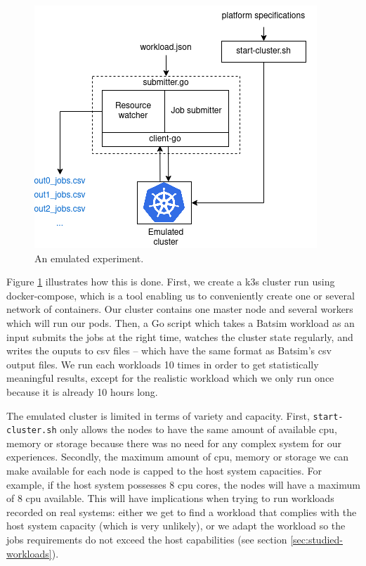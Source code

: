 \begin{figure}[H]
	\centering
	\includegraphics[scale=0.7]{./imgs/prot-k3s.png}
	\caption{An emulated experiment.}
	\label{fig:emulated-expe}
\end{figure}

Figure \ref{fig:emulated-expe} illustrates how this is done. First, we create a
k3s cluster run using docker-compose, which is a tool enabling us to
conveniently create one or several network of containers. Our cluster contains
one master node and several workers which will run our pods. Then, a Go script
which takes a Batsim workload as an input submits the jobs at the right time,
watches the cluster state regularly, and writes the ouputs to csv files --
which have the same format as Batsim's csv output files. We run each workloads
10 times in order to get statistically meaningful results, except for the
realistic workload which we only run once because it is already 10 hours long.

The emulated cluster is limited in terms of variety and capacity. First,
\texttt{start-cluster.sh} only allows the nodes to have the same amount of
available cpu, memory or storage because there was no need for any complex
system for our experiences. Secondly, the maximum amount of cpu, memory or
storage we can make available for each node is capped to the host system
capacities. For example, if the host system possesses 8 cpu cores, the nodes
will have a maximum of 8 cpu available. This will have implications when trying
to run workloads recorded on real systems: either we get to find a workload
that complies with the host system capacity (which is very unlikely), or we
adapt the workload so the jobs requirements do not exceed the host
capabilities (see section \ref{sec:studied-workloads}).

